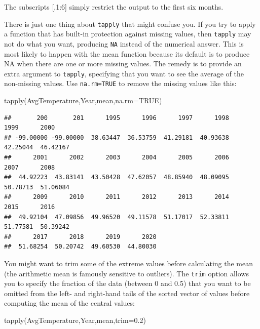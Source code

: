 \documentclass[
]{book}
\newenvironment{Shaded}{\begin{snugshade}}{\end{snugshade}}
\newcommand{\AttributeTok}[1]{\textcolor[rgb]{0.77,0.63,0.00}{#1}}
\newcommand{\ConstantTok}[1]{\textcolor[rgb]{0.00,0.00,0.00}{#1}}
\newcommand{\FloatTok}[1]{\textcolor[rgb]{0.00,0.00,0.81}{#1}}
\newcommand{\FunctionTok}[1]{\textcolor[rgb]{0.00,0.00,0.00}{#1}}
\newcommand{\NormalTok}[1]{#1}
\begin{document}
The subscripts {[},1:6{]} simply restrict the output to the first six months.

There is just one thing about \texttt{tapply} that might confuse you. If you try to apply a function that has built-in protection against missing values, then \texttt{tapply} may not do what you want, producing \texttt{NA} instead of the numerical answer. This is most likely to happen with the mean function because its default is to produce NA when there are one or more missing values. The remedy is to provide an extra argument to \texttt{tapply}, specifying that you want to see the average of the non-missing values. Use \texttt{na.rm=TRUE} to remove the missing values like this:

\begin{Shaded}
\begin{Highlighting}[]
\FunctionTok{tapply}\NormalTok{(AvgTemperature,Year,mean,}\AttributeTok{na.rm=}\ConstantTok{TRUE}\NormalTok{)}
\end{Highlighting}
\end{Shaded}

\begin{verbatim}
##       200       201      1995      1996      1997      1998      1999      2000 
## -99.00000 -99.00000  38.63447  36.53759  41.29181  40.93638  42.25044  46.42167 
##      2001      2002      2003      2004      2005      2006      2007      2008 
##  44.92223  43.83141  43.50428  47.62057  48.85940  48.09095  50.78713  51.06084 
##      2009      2010      2011      2012      2013      2014      2015      2016 
##  49.92104  47.09856  49.96520  49.11578  51.17017  52.33811  51.77581  50.39242 
##      2017      2018      2019      2020 
##  51.68254  50.20742  49.60530  44.80030
\end{verbatim}

You might want to trim some of the extreme values before calculating the mean (the arithmetic mean is famously sensitive to outliers). The \texttt{trim} option allows you to specify the fraction of the data (between 0 and 0.5) that you want to be omitted from the left- and right-hand tails of the sorted vector of values before computing the mean of the central values:

\begin{Shaded}
\begin{Highlighting}[]
\FunctionTok{tapply}\NormalTok{(AvgTemperature,Year,mean,}\AttributeTok{trim=}\FloatTok{0.2}\NormalTok{)}
\end{Highlighting}
\end{Shaded}
\end{document}

